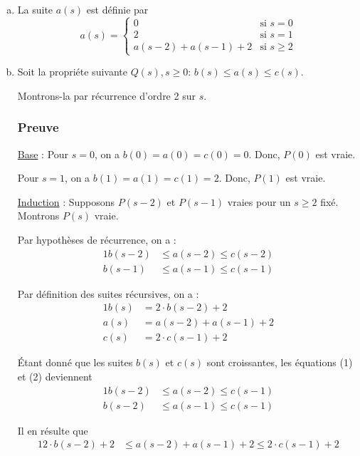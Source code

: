 \documentclass[12pt,a4paper]{article}
\begin{document}
\begin{enumerate}[a)]
\item La suite $a(s)$ est d\'efinie par
\[ a(s) = \begin{cases} 
      0 & \text{si } s = 0 \\
      2 & \text{si } s = 1 \\
      a(s-2) + a(s-1) + 2 & \text{si } s\geq 2 
   \end{cases}
\]

\item Soit la propri\'ete suivante $Q(s), s\geq 0$: $ b(s) \leq a(s) \leq c(s) $.

Montrons-la par r\'ecurrence d'ordre 2 sur $s$. 

\subsubsection*{Preuve}
\underline{Base} : Pour \( s = 0\), on a $b(0) = a(0) = c(0) = 0 $. Donc, $P(0)$ est vraie.

Pour \( s = 1\), on a $b(1) = a(1) = c(1) = 2 $. Donc, $P(1)$ est vraie.

\underline{Induction} : Supposons \( P(s-2) \) et \( P(s-1) \) vraies pour un \( s \geq 2 \) fix\'e. Montrons \( P(s) \) vraie.

Par hypoth\`eses de r\'ecurrence, on a : 
\begin{alignat}{1}
b(s-2) &\leq a(s-2) \leq c(s-2) \\
b(s-1) &\leq a(s-1) \leq c(s-1)
\end{alignat} 

Par d\'efinition des suites r\'ecursives, on a :
\begin{alignat}{1}
b(s) &= 2\cdot b(s-2) + 2 \\
a(s) &= a(s-2) + a(s-1) + 2 \\
c(s) &= 2\cdot c(s-1) + 2
\end{alignat}

\'Etant donn\'e que les suites $b(s)$ et $c(s)$ sont croissantes, les \'equations (1) et (2) deviennent
\begin{alignat*}{1}
b(s-2) &\leq a(s-2) \leq c(s-1) \\
b(s-2) &\leq a(s-1) \leq c(s-1)
\end{alignat*}

Il en r\'esulte que 
\begin{alignat}{1}
2\cdot b(s-2) + 2 &\leq a(s-2) + a(s-1) + 2 \leq 2\cdot c(s-1) + 2
\end{alignat}


\end{enumerate}
\end{document}
